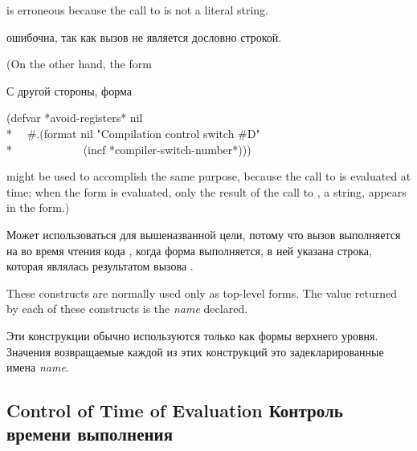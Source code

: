 \begin{defmac}
\begin{new}
is erroneous because the call to  is not a literal string.

ошибочна, так как вызов  не является дословно строкой.

(On the other hand, the form

С другой стороны, форма

\begin{lisp}
(defvar *avoid-registers* nil \\*
~~\#.(format nil "Compilation control switch \#{\Xtilde}D" \\*
~~~~~~~~~~~~(incf *compiler-switch-number*)))
\end{lisp}

might be used to accomplish the same purpose, because the call to
 is evaluated at  time; when the  form
is evaluated, only the result of the call to , a string,
appears in the  form.)

Может использоваться для вышеназванной цели, потому что вызов 
выполняется на во время чтения кода , когда форма 
выполняется, в ней указана строка, которая являлась результатом вызова
.

\end{new}

These constructs are normally used only as top-level forms.  The
value returned by each of these constructs is the \textit{name} declared.

Эти конструкции обычно используются только как формы верхнего уровня. Значения
возвращаемые каждой из этих конструкций это задекларированные имена \textit{name}.
\end{defmac}

\subsection{Control of Time of Evaluation Контроль времени выполнения}

